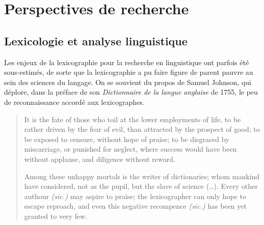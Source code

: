 


\section{Perspectives de recherche}
\label{sec:recherche}

\subsection{Lexicologie et analyse linguistique}

Les enjeux de la lexicographie pour la recherche en linguistique ont parfois été sous-estimés, de sorte que la lexicographie a pu faire figure de parent pauvre au sein des sciences du langage. On se souvient du propos de Samuel Johnson, qui déplore, dans la préface de son \emph{Dictionnaire de la langue anglaise} de 1755, le peu de reconnaissance accordé aux lexicographes.

\begin{quotation}
    It is the fate of those who toil at the lower employments of life, to be rather driven by the fear of evil, than attracted by the prospect of good; to be exposed to censure, without hope of praise; to be disgraced by miscarriage, or punished for neglect, where success would have been without applause, and diligence without reward.

    Among these unhappy mortals is the writer of dictionaries; whom mankind have considered, not as the pupil, but the slave of science (…). Every other authour \emph{(sic.)} may aspire to praise; the lexicographer can only hope to escape reproach, and even this negative recompence \emph{(sic.)} has been yet granted to very few.
\end{quotation}


